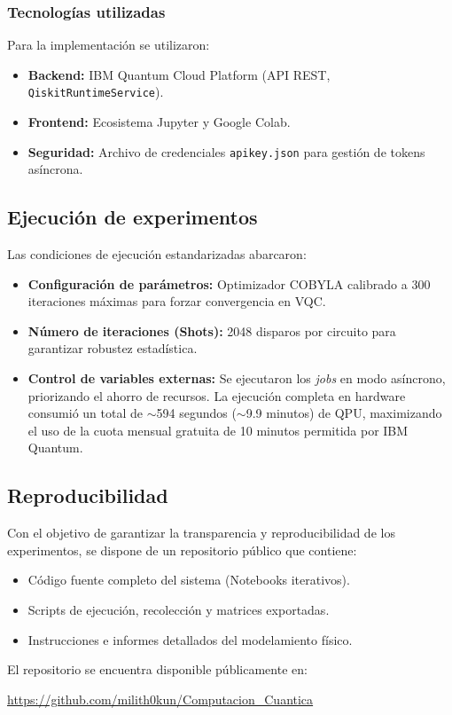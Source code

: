 \subsubsection{Tecnolog\'ias utilizadas}
Para la implementaci\'on se utilizaron:
\begin{itemize}
    \item \textbf{Backend:} IBM Quantum Cloud Platform (API REST, \texttt{QiskitRuntimeService}).
    \item \textbf{Frontend:} Ecosistema Jupyter y Google Colab.
    \item \textbf{Seguridad:} Archivo de credenciales \texttt{apikey.json} para gesti\'on de tokens as\'incrona.
\end{itemize}

\subsection{Ejecuci\'on de experimentos}
Las condiciones de ejecuci\'on estandarizadas abarcaron:
\begin{itemize}
    \item \textbf{Configuraci\'on de par\'ametros:} Optimizador COBYLA calibrado a 300 iteraciones m\'aximas para forzar convergencia en VQC.
    \item \textbf{N\'umero de iteraciones (Shots):} 2048 disparos por circuito para garantizar robustez estad\'istica.
    \item \textbf{Control de variables externas:} Se ejecutaron los \textit{jobs} en modo as\'incrono, priorizando el ahorro de recursos. La ejecuci\'on completa en hardware consumi\'o un total de $\sim$594 segundos ($\sim$9.9 minutos) de QPU, maximizando el uso de la cuota mensual gratuita de 10 minutos permitida por IBM Quantum.
\end{itemize}

\subsection{Reproducibilidad}
Con el objetivo de garantizar la transparencia y reproducibilidad de los experimentos, se dispone de un repositorio p\'ublico que contiene:
\begin{itemize}
    \item C\'odigo fuente completo del sistema (Notebooks iterativos).
    \item Scripts de ejecuci\'on, recolecci\'on y matrices exportadas.
    \item Instrucciones e informes detallados del modelamiento f\'isico.
\end{itemize}

El repositorio se encuentra disponible p\'ublicamente en:
\begin{center}
    \url{https://github.com/milith0kun/Computacion_Cuantica}
\end{center}
